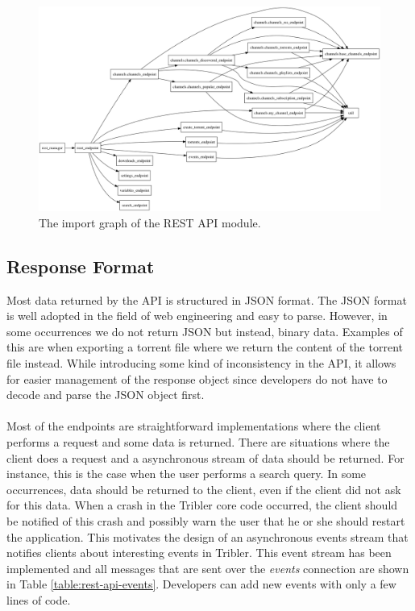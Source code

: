\begin{figure}[h!]
	\centering
	\includegraphics[width=1.0\columnwidth]{images/improving_qa/importgraph_api}
	\caption{The import graph of the REST API module.}
	\label{fig:importgraph-api}
\end{figure}

\subsection{Response Format}
Most data returned by the API is structured in JSON format. The JSON format is well adopted in the field of web engineering and easy to parse. However, in some occurrences we do not return JSON but instead, binary data. Examples of this are when exporting a torrent file where we return the content of the torrent file instead. While introducing some kind of inconsistency in the API, it allows for easier management of the response object since developers do not have to decode and parse the JSON object first.\\\\
Most of the endpoints are straightforward implementations where the client performs a request and some data is returned. There are situations where the client does a request and a asynchronous stream of data should be returned. For instance, this is the case when the user performs a search query. In some occurrences, data should be returned to the client, even if the client did not ask for this data. When a crash in the Tribler core code occurred, the client should be notified of this crash and possibly warn the user that he or she should restart the application. This motivates the design of an asynchronous events stream that notifies clients about interesting events in Tribler. This event stream has been implemented and all messages that are sent over the \emph{events} connection are shown in Table \ref{table:rest-api-events}. Developers can add new events with only a few lines of code.\\

